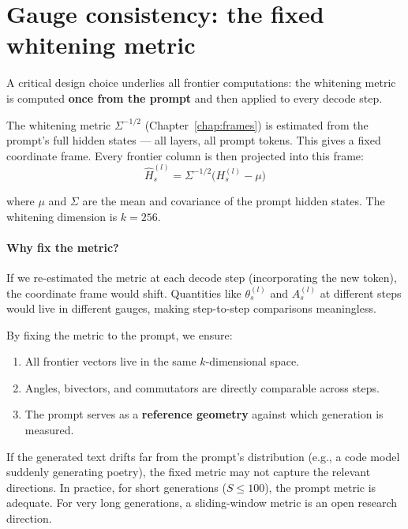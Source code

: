 \documentclass[11pt, twoside, openright]{memoir}
\numberwithin{equation}{chapter}
\begin{document}
\section{Gauge consistency: the fixed whitening metric}
\label{sec:frontier-gauge}

A critical design choice underlies all frontier computations: the
whitening metric is computed \textbf{once from the prompt} and then
applied to every decode step.

\begin{keyidea}
The whitening metric $\Sigma^{-1/2}$ (Chapter~\ref{chap:frames})
is estimated from the prompt's full hidden states --- all layers,
all prompt tokens.  This gives a fixed coordinate frame.  Every
frontier column is then projected into this frame:
\begin{equation}
  \hat{H}^{(l)}_s = \Sigma^{-1/2}\bigl(H^{(l)}_s - \mu\bigr)
\end{equation}

where $\mu$ and $\Sigma$ are the mean and covariance of the
prompt hidden states.  The whitening dimension is $k = 256$.
\end{keyidea}

\paragraph{Why fix the metric?}

If we re-estimated the metric at each decode step (incorporating the
new token), the coordinate frame would shift.  Quantities like
$\theta^{(l)}_s$ and $A^{(l)}_s$ at different steps would live in
different gauges, making step-to-step comparisons meaningless.

By fixing the metric to the prompt, we ensure:

\begin{enumerate}[nosep]
\item All frontier vectors live in the same $k$-dimensional space.
\item Angles, bivectors, and commutators are directly comparable
  across steps.
\item The prompt serves as a \textbf{reference geometry} against
  which generation is measured.
\end{enumerate}

\begin{pitfall}
If the generated text drifts far from the prompt's distribution
(e.g., a code model suddenly generating poetry), the fixed metric
may not capture the relevant directions.  In practice, for short
generations ($S \leq 100$), the prompt metric is adequate.
For very long generations, a sliding-window metric is an open
research direction.
\end{pitfall}
\end{document}
